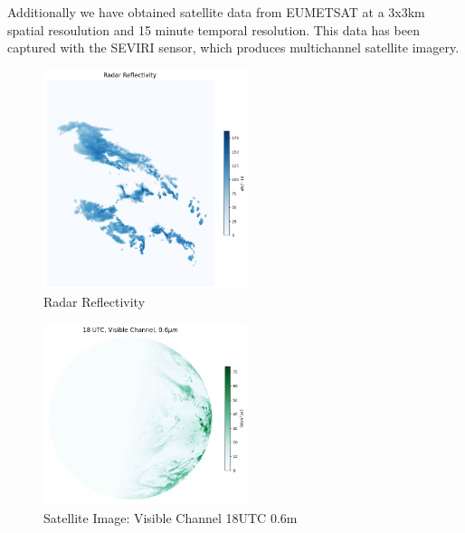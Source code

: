 \documentclass[acmtog, authorversion]{acmart}
\begin{document}
Additionally we have obtained satellite data from \textsc{EUMETSAT} at a 3x3km spatial resoulution and 15 minute temporal resolution. This data has been captured with the \textsc{SEVIRI} sensor, which produces multichannel satellite imagery.

\begin{figure}
    \centering
    \includegraphics[width=225]{report/images/radar_reflectivity.png}
    \caption{Radar Reflectivity}
    \label{fig:my_label}
\end{figure}

\begin{figure}
    \centering
    \includegraphics[width=225]{report/images/vis_006.png}
    \caption{Satellite Image: Visible Channel 18UTC 0.6\mu m}
    \label{fig:my_label}
\end{figure}
\end{document}
